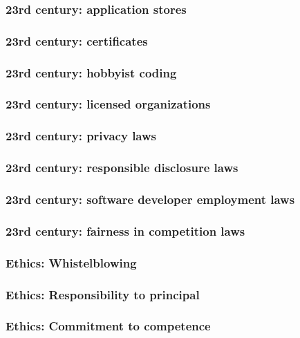 \begin{frame}[fragile]
\frametitle{23rd century: application stores}

\end{frame}

\begin{frame}[fragile]
\frametitle{23rd century: certificates}

\end{frame}

\begin{frame}[fragile]
\frametitle{23rd century: hobbyist coding}

\end{frame}

\begin{frame}[fragile]
\frametitle{23rd century: licensed organizations}

\end{frame}

\begin{frame}[fragile]
\frametitle{23rd century: privacy laws}

\end{frame}

\begin{frame}[fragile]
\frametitle{23rd century: responsible disclosure laws}

\end{frame}

\begin{frame}[fragile]
\frametitle{23rd century: software developer employment laws}

\end{frame}

\begin{frame}[fragile]
\frametitle{23rd century: fairness in competition laws}

\end{frame}

\begin{frame}[fragile]
\frametitle{Ethics: Whistelblowing}

\end{frame}

\begin{frame}[fragile]
\frametitle{Ethics: Responsibility to principal}

\end{frame}

\begin{frame}[fragile]
\frametitle{Ethics: Commitment to competence}

\end{frame}

